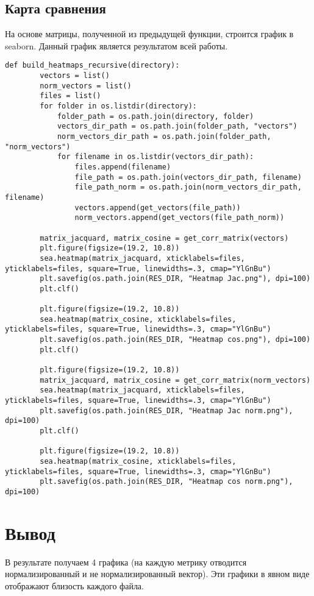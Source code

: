 \subsection{Карта сравнения}

На основе матрицы, полученной из предыдущей функции, строится график в seaborn. Данный график является результатом всей работы.

\begin{lstlisting}[label=heatmaps, caption={Получение результирующих графиков}]
    def build_heatmaps_recursive(directory):
        vectors = list()
        norm_vectors = list()
        files = list()
        for folder in os.listdir(directory):
            folder_path = os.path.join(directory, folder)
            vectors_dir_path = os.path.join(folder_path, "vectors")
            norm_vectors_dir_path = os.path.join(folder_path, "norm_vectors")
            for filename in os.listdir(vectors_dir_path):
                files.append(filename)
                file_path = os.path.join(vectors_dir_path, filename)
                file_path_norm = os.path.join(norm_vectors_dir_path, filename)
                vectors.append(get_vectors(file_path))
                norm_vectors.append(get_vectors(file_path_norm))

        matrix_jacquard, matrix_cosine = get_corr_matrix(vectors)
        plt.figure(figsize=(19.2, 10.8))
        sea.heatmap(matrix_jacquard, xticklabels=files, yticklabels=files, square=True, linewidths=.3, cmap="YlGnBu")
        plt.savefig(os.path.join(RES_DIR, "Heatmap Jac.png"), dpi=100)
        plt.clf()

        plt.figure(figsize=(19.2, 10.8))
        sea.heatmap(matrix_cosine, xticklabels=files, yticklabels=files, square=True, linewidths=.3, cmap="YlGnBu")
        plt.savefig(os.path.join(RES_DIR, "Heatmap cos.png"), dpi=100)
        plt.clf()

        plt.figure(figsize=(19.2, 10.8))
        matrix_jacquard, matrix_cosine = get_corr_matrix(norm_vectors)
        sea.heatmap(matrix_jacquard, xticklabels=files, yticklabels=files, square=True, linewidths=.3, cmap="YlGnBu")
        plt.savefig(os.path.join(RES_DIR, "Heatmap Jac norm.png"), dpi=100)
        plt.clf()

        plt.figure(figsize=(19.2, 10.8))
        sea.heatmap(matrix_cosine, xticklabels=files, yticklabels=files, square=True, linewidths=.3, cmap="YlGnBu")
        plt.savefig(os.path.join(RES_DIR, "Heatmap cos norm.png"), dpi=100)
\end{lstlisting}

\section*{Вывод}

В результате получаем 4 графика (на каждую метрику отводится нормализированный и не нормализированный вектор). 
Эти графики в явном виде отображают близость каждого файла.

\clearpage
